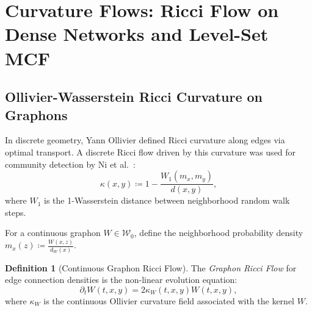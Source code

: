 \documentclass[11pt,a4paper,reqno]{amsart}
\theoremstyle{definition}
\newtheorem{definition}[theorem]{Definition}
\numberwithin{equation}{section}
\begin{document}
\section{Curvature Flows: Ricci Flow on Dense Networks and Level-Set MCF}
\label{sec:curvature_flows}

\subsection{Ollivier-Wasserstein Ricci Curvature on Graphons}
In discrete geometry, Yann Ollivier \cite{ollivier2009ricci} defined Ricci curvature along edges via optimal transport. A discrete Ricci flow driven by this curvature was used for community detection by Ni et al.~\cite{ni2019community}:
\begin{equation}
    \kappa(x, y) \coloneqq 1 - \frac{W_1(m_x, m_y)}{d(x, y)},
\end{equation}
where $W_1$ is the 1-Wasserstein distance between neighborhood random walk steps.

For a continuous graphon $W \in \mathcal{W}_0$, define the neighborhood probability density $m_x(z) \coloneqq \frac{W(x, z)}{d_W(x)}$.

\begin{definition}[Continuous Graphon Ricci Flow]
The \emph{Graphon Ricci Flow} for edge connection densities is the non-linear evolution equation:
\begin{equation}
    \label{eq:graphon_ricci}
    \partial_t W(t, x, y) = 2 \kappa_W(t, x, y) W(t, x, y),
\end{equation}
where $\kappa_W$ is the continuous Ollivier curvature field associated with the kernel $W$.
\end{definition}
\end{document}
